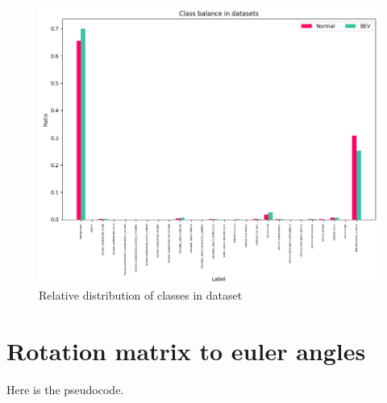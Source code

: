 \begin{figure}[h!]
    \centering
    \includegraphics[width=\linewidth]{images/appendix/dataset_class_balance_ratio.png}
    \caption{Relative distribution of classes in dataset}
    \label{fig:dataset_class_balance_ratio}
\end{figure}

\section{Rotation matrix to euler angles}
Here \cite{euler_from_matrix} is the pseudocode.


